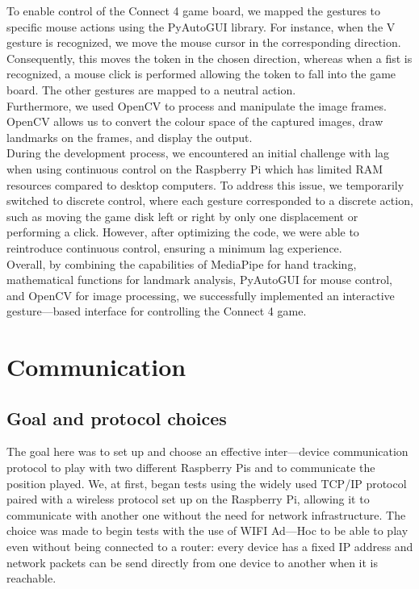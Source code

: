 \documentclass[11pt, a4paper, oneside]{report}
\begin{document}
	To enable control of the Connect 4 game board, we mapped the gestures to specific mouse actions using the PyAutoGUI library. For instance, when the V gesture is recognized, we move the mouse cursor in the corresponding direction. Consequently, this moves the token in the chosen direction, whereas when a fist is recognized, a mouse click is performed allowing the token to fall into the game board. The other gestures are mapped to a neutral action. \\

	Furthermore, we used OpenCV to process and manipulate the image frames. OpenCV allows us to convert the colour space of the captured images, draw landmarks on the frames, and display the output. \\

	During the development process, we encountered an initial challenge with lag when using continuous control on the Raspberry Pi which has limited RAM resources compared to desktop computers. To address this issue, we temporarily switched to discrete control, where each gesture corresponded to a discrete action, such as moving the game disk left or right by only one displacement or performing a click. However, after optimizing the code, we were able to reintroduce continuous control, ensuring a minimum lag experience. \\

	Overall, by combining the capabilities of MediaPipe for hand tracking, mathematical functions for landmark analysis, PyAutoGUI for mouse control, and OpenCV for image processing, we successfully implemented an interactive gesture—based interface for controlling the Connect 4 game. \\

	\section{Communication}
	\subsection{Goal and protocol choices}
	The goal here was to set up and choose an effective inter—device communication protocol to play with two different Raspberry Pis and to communicate the position played. We, at first, began tests using the widely used TCP/IP protocol paired with a wireless protocol set up on the Raspberry Pi, allowing it to communicate with another one without the need for network infrastructure. The choice was made to begin tests with the use of WIFI Ad—Hoc to be able to play even without being connected to a router: every device has a fixed IP address and network packets can be send directly from one device to another when it is reachable. \\
\end{document}
